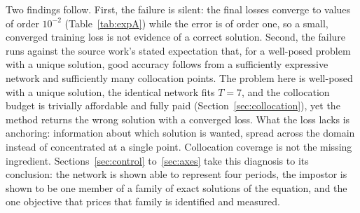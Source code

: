 \documentclass[11pt,a4paper]{article}
\begin{document}
Two findings follow. First, the failure is silent: the final losses
converge to values of order $10^{-2}$ (Table~\ref{tab:expA}) while the
error is of order one, so a small, converged training loss is not evidence
of a correct solution. Second, the failure runs against
the source work's stated expectation that, for a well-posed problem with a
unique solution, good accuracy follows from a sufficiently expressive
network and sufficiently many collocation points. The problem here is
well-posed with a unique solution, the identical network fits $T = 7$, and
the collocation budget is trivially affordable and fully paid
(Section~\ref{sec:collocation}), yet the method returns the wrong solution
with a converged loss. What the loss lacks is anchoring: information about
which solution is wanted, spread across the domain instead of concentrated
at a single point. Collocation coverage is not the missing ingredient. Sections~\ref{sec:control} to~\ref{sec:axes} take this diagnosis to its conclusion: the network is shown able to represent four periods, the impostor is shown to be one member of a family of exact solutions of the equation, and the one objective that prices that family is identified and measured.
\end{document}
